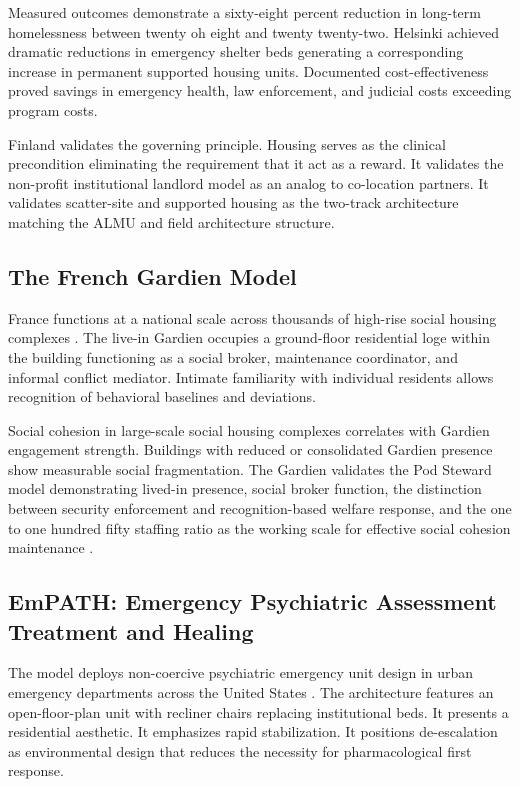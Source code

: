 \documentclass[12pt, letterpaper]{article}
\begin{document}
Measured outcomes demonstrate a sixty-eight percent reduction in long-term homelessness between twenty oh eight and twenty twenty-two. Helsinki achieved dramatic reductions in emergency shelter beds generating a corresponding increase in permanent supported housing units. Documented cost-effectiveness proved savings in emergency health, law enforcement, and judicial costs exceeding program costs.

Finland validates the governing principle. Housing serves as the clinical precondition eliminating the requirement that it act as a reward. It validates the non-profit institutional landlord model as an analog to co-location partners. It validates scatter-site and supported housing as the two-track architecture matching the ALMU and field architecture structure.

\subsection{The French Gardien Model}

France functions at a national scale across thousands of high-rise social housing complexes \citep{harvard_gsd_gardien, tu_eindhoven_2024}. The live-in Gardien occupies a ground-floor residential loge within the building functioning as a social broker, maintenance coordinator, and informal conflict mediator. Intimate familiarity with individual residents allows recognition of behavioral baselines and deviations.

Social cohesion in large-scale social housing complexes correlates with Gardien engagement strength. Buildings with reduced or consolidated Gardien presence show measurable social fragmentation. The Gardien validates the Pod Steward model demonstrating lived-in presence, social broker function, the distinction between security enforcement and recognition-based welfare response, and the one to one hundred fifty staffing ratio as the working scale for effective social cohesion maintenance \citep{dunbar_1992}.

\subsection{EmPATH: Emergency Psychiatric Assessment Treatment and Healing}

The model deploys non-coercive psychiatric emergency unit design in urban emergency departments across the United States \citep{empath_model_2020}. The architecture features an open-floor-plan unit with recliner chairs replacing institutional beds. It presents a residential aesthetic. It emphasizes rapid stabilization. It positions de-escalation as environmental design that reduces the necessity for pharmacological first response.
\end{document}
